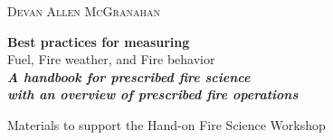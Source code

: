 	\raggedleft %
	
	\vspace*{\baselineskip} %
	
	
	\textsc{{\Large Devan Allen McGranahan}} %
	
	\vspace*{0.167\textheight} %
	
	
	\textbf{\LARGE Best practices for measuring} \\ 
	[\baselineskip] %
	
	{\textcolor{BisonGreen}{\Huge Fuel, Fire weather, and Fire behavior}}\\[\baselineskip] %
	
\textit{\textbf{\LARGE A handbook for prescribed fire science\\with an overview of prescribed fire operations}}\\[\baselineskip] %
\vspace*{1cm} %
	
	{\Large Materials to support the Hand-on Fire Science Workshop} 
\vfill
\vspace*{2cm} %

\vfill 

	
	
	{\plogo }%
	
\vspace*{1\baselineskip} %